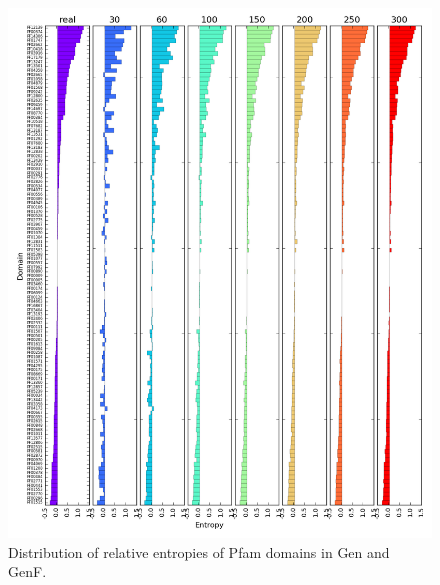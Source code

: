 \documentclass[12pt]{report}
\begin{document}
\begin{enumerate}
\begin{enumerate}
 \begin{figure}[H]
  \centering
    \includegraphics[width=450px]{entropies_matrix_entropies_tab_bar.png}
    \caption{Distribution of relative entropies of Pfam domains in Gen and GenF.}
        \label{fig:barplot}
\end{figure}


\end{enumerate}
\end{enumerate}
\end{document}
